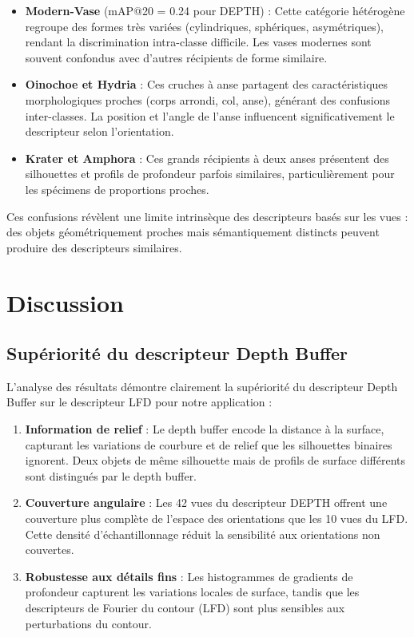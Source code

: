 \documentclass[11pt,a4paper,oneside]{report}
\begin{document}
\begin{itemize}
\item \textbf{Modern-Vase} (mAP@20 = 0.24 pour DEPTH) : Cette catégorie hétérogène regroupe des formes très variées (cylindriques, sphériques, asymétriques), rendant la discrimination intra-classe difficile. Les vases modernes sont souvent confondus avec d'autres récipients de forme similaire.

\item \textbf{Oinochoe et Hydria} : Ces cruches à anse partagent des caractéristiques morphologiques proches (corps arrondi, col, anse), générant des confusions inter-classes. La position et l'angle de l'anse influencent significativement le descripteur selon l'orientation.

\item \textbf{Krater et Amphora} : Ces grands récipients à deux anses présentent des silhouettes et profils de profondeur parfois similaires, particulièrement pour les spécimens de proportions proches.
\end{itemize}

Ces confusions révèlent une limite intrinsèque des descripteurs basés sur les vues : des objets géométriquement proches mais sémantiquement distincts peuvent produire des descripteurs similaires.

\section{Discussion}

\subsection{Supériorité du descripteur Depth Buffer}

L'analyse des résultats démontre clairement la supériorité du descripteur Depth Buffer sur le descripteur LFD pour notre application :

\begin{enumerate}
\item \textbf{Information de relief} : Le depth buffer encode la distance à la surface, capturant les variations de courbure et de relief que les silhouettes binaires ignorent. Deux objets de même silhouette mais de profils de surface différents sont distingués par le depth buffer.

\item \textbf{Couverture angulaire} : Les 42 vues du descripteur DEPTH offrent une couverture plus complète de l'espace des orientations que les 10 vues du LFD. Cette densité d'échantillonnage réduit la sensibilité aux orientations non couvertes.

\item \textbf{Robustesse aux détails fins} : Les histogrammes de gradients de profondeur capturent les variations locales de surface, tandis que les descripteurs de Fourier du contour (LFD) sont plus sensibles aux perturbations du contour.
\end{enumerate}
\end{document}
